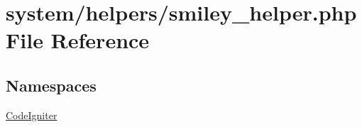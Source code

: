 \hypertarget{smiley__helper_8php}{}\section{system/helpers/smiley\+\_\+helper.php File Reference}
\label{smiley__helper_8php}
\subsection*{Namespaces}
\begin{DoxyCompactItemize}
\item 
 \mbox{\hyperlink{namespace_code_igniter}{Code\+Igniter}}
\end{DoxyCompactItemize}
